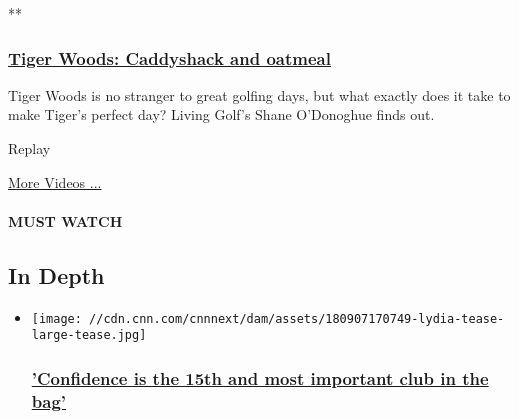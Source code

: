 **

\hypertarget{tiger-woods-caddyshack-and-oatmeal}{%
\subsubsection{\texorpdfstring{\href{/videos/sports/2017/02/28/tiger-woods-perfect-day-dubai-caddyshack-earl-woods-oatmeal-living-golf-orig.cnn}{Tiger
Woods: Caddyshack and
oatmeal}}{Tiger Woods: Caddyshack and oatmeal}}\label{tiger-woods-caddyshack-and-oatmeal}}

Tiger Woods is no stranger to great golfing days, but what exactly does
it take to make Tiger's perfect day? Living Golf's Shane O'Donoghue
finds out.

\href{javascript:void(0);}{}

Replay

\href{/videos}{More Videos ...}

\hypertarget{must-watch}{%
\paragraph{MUST WATCH}\label{must-watch}}

\hypertarget{in-depth-}{%
\subsection{In Depth~}\label{in-depth-}}

\begin{itemize}
\item
  \href{/2018/09/13/golf/lydia-ko-golf-lpga-tour-womens-golf-south-korea-new-zealand-intl-spt/index.html}{}

  \texttt{[image: //cdn.cnn.com/cnnnext/dam/assets/180907170749-lydia-tease-large-tease.jpg]}

  \hypertarget{confidence-is-the-15th-and-most-important-club-in-the-bag}{%
  \subsubsection{\texorpdfstring{\href{/2018/09/13/golf/lydia-ko-golf-lpga-tour-womens-golf-south-korea-new-zealand-intl-spt/index.html}{'Confidence
  is the 15th and most important club in the
  bag'}}{'Confidence is the 15th and most important club in the bag'}}\label{confidence-is-the-15th-and-most-important-club-in-the-bag}}
\end{itemize}

